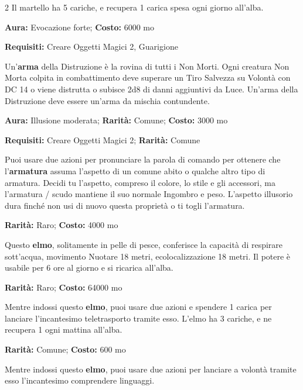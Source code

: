 \begin{multicols}{2}
Il martello ha 5 cariche, e recupera 1 carica spesa ogni giorno all'alba.


\textbf{Aura:} Evocazione forte; \textbf{Costo:} 6000 mo

\textbf{Requisiti:} Creare Oggetti Magici 2, Guarigione

Un'\textbf{arma} della Distruzione è la rovina di tutti i Non Morti. Ogni creatura Non Morta colpita in combattimento deve superare un Tiro Salvezza su Volontà con DC 14 o viene distrutta o subisce 2d8 di danni aggiuntivi da Luce. Un'arma della Distruzione deve essere un'arma da mischia contundente.


\textbf{Aura:} Illusione moderata; \textbf{Rarità:} Comune; \textbf{Costo:} 3000 mo

\textbf{Requisiti:} Creare Oggetti Magici 2; \textbf{Rarità:} Comune

Puoi usare due azioni per pronunciare la parola di comando per ottenere che l'\textbf{armatura} assuma l'aspetto di un comune abito o qualche altro tipo di armatura. Decidi tu l'aspetto, compreso il colore, lo stile e gli accessori, ma l'armatura / scudo mantiene il suo normale Ingombro e peso. L'aspetto illusorio dura finché non usi di nuovo questa proprietà o ti togli l'armatura.


\textbf{Rarità:} Raro; \textbf{Costo:} 4000 mo

Questo \textbf{elmo}, solitamente in pelle di pesce, conferisce la capacità di respirare sott'acqua, movimento Nuotare 18 metri, ecolocalizzazione 18 metri. Il potere è usabile per 6 ore al giorno e si ricarica all'alba.


\textbf{Rarità:} Raro; \textbf{Costo:} 64000 mo

Mentre indossi questo \textbf{elmo}, puoi usare due azioni e spendere 1 carica per lanciare l'incantesimo teletrasporto tramite esso. L'elmo ha 3 cariche, e ne recupera 1 ogni mattina all'alba.


\textbf{Rarità:} Comune; \textbf{Costo:} 600 mo

Mentre indossi questo \textbf{elmo}, puoi usare due azioni per lanciare a volontà tramite esso l'incantesimo comprendere linguaggi.


\end{multicols}
